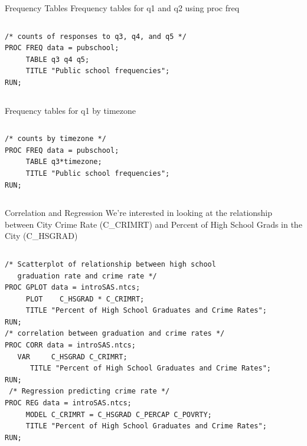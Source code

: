 \documentclass[table,smaller]{beamer}
\begin{document}
\begin{frame}[fragile,label=sec-3-2]{Frequency Tables}
 Frequency tables for q1 and q2 using proc freq
\vspace{-.75em} \begin{columns}  \begin{block}{}
\begin{verbatim}
/* counts of responses to q3, q4, and q5 */
PROC FREQ data = pubschool;
     TABLE q3 q4 q5;
     TITLE "Public school frequencies";
RUN;
\end{verbatim}
\end{block} \end{columns} \vspace{.25em}

Frequency tables for q1 by timezone
\vspace{-.75em} \begin{columns}  \begin{block}{}
\begin{verbatim}
/* counts by timezone */
PROC FREQ data = pubschool;
     TABLE q3*timezone;
     TITLE "Public school frequencies";
RUN;
\end{verbatim}
\end{block} \end{columns} \vspace{.25em}
\end{frame}

\begin{frame}[fragile,label=sec-3-3]{Correlation and Regression}
 We're interested in looking at the relationship between City Crime Rate (C\_CRIMRT) and Percent of High School Grads in the City (C\_HSGRAD)

\vspace{-.75em} \begin{columns}  \begin{block}{}
\begin{verbatim}
/* Scatterplot of relationship between high school
   graduation rate and crime rate */
PROC GPLOT data = introSAS.ntcs;
     PLOT    C_HSGRAD * C_CRIMRT;
     TITLE "Percent of High School Graduates and Crime Rates";
RUN;
/* correlation between graduation and crime rates */
PROC CORR data = introSAS.ntcs;
   VAR     C_HSGRAD C_CRIMRT;
      TITLE "Percent of High School Graduates and Crime Rates";
RUN;
 /* Regression predicting crime rate */
PROC REG data = introSAS.ntcs;
     MODEL C_CRIMRT = C_HSGRAD C_PERCAP C_POVRTY;
     TITLE "Percent of High School Graduates and Crime Rates";
RUN;
\end{verbatim}
\end{block} \end{columns} \vspace{.25em}
\end{frame}
\end{document}

